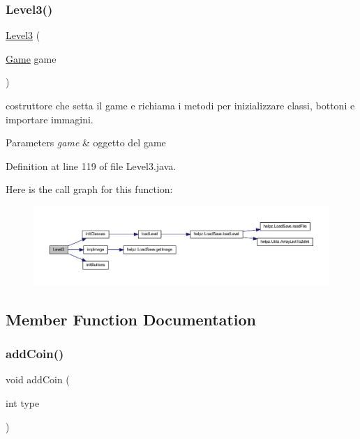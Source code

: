\subsubsection{\texorpdfstring{Level3()}{Level3()}}
{\footnotesize\ttfamily \hyperlink{classscenes_1_1_level3}{Level3} (\begin{DoxyParamCaption}\item[{\hyperlink{classprogetto_1_1_game}{Game}}]{game }\end{DoxyParamCaption})}



costruttore che setta il game e richiama i metodi per inizializzare classi, bottoni e importare immagini. 


\begin{DoxyParams}{Parameters}
{\em game} & oggetto del game \\
\hline
\end{DoxyParams}


Definition at line 119 of file Level3.\+java.

Here is the call graph for this function\+:\nopagebreak
\begin{figure}[H]
\begin{center}
\leavevmode
\includegraphics[width=350pt]{classscenes_1_1_level3_a0f56949b20e6eda500c5b9c50e16de58_cgraph}
\end{center}
\end{figure}


\subsection{Member Function Documentation}
\mbox{\label{classscenes_1_1_level3_a9f0f7dc28e596d2ebcd06e27ef05d9fd}} 
\subsubsection{\texorpdfstring{add\+Coin()}{addCoin()}}
{\footnotesize\ttfamily void add\+Coin (\begin{DoxyParamCaption}\item[{int}]{type }\end{DoxyParamCaption})}



